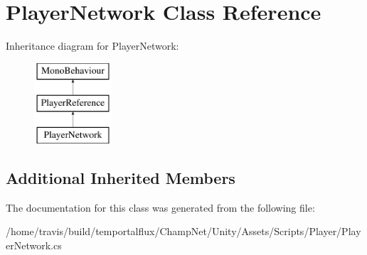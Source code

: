 \hypertarget{class_player_network}{\section{Player\-Network Class Reference}
\label{class_player_network}
}
Inheritance diagram for Player\-Network\-:\begin{figure}[H]
\begin{center}
\leavevmode
\includegraphics[height=3.000000cm]{class_player_network}
\end{center}
\end{figure}
\subsection*{Additional Inherited Members}


The documentation for this class was generated from the following file\-:\begin{DoxyCompactItemize}
\item 
/home/travis/build/temportalflux/\-Champ\-Net/\-Unity/\-Assets/\-Scripts/\-Player/Player\-Network.\-cs\end{DoxyCompactItemize}
